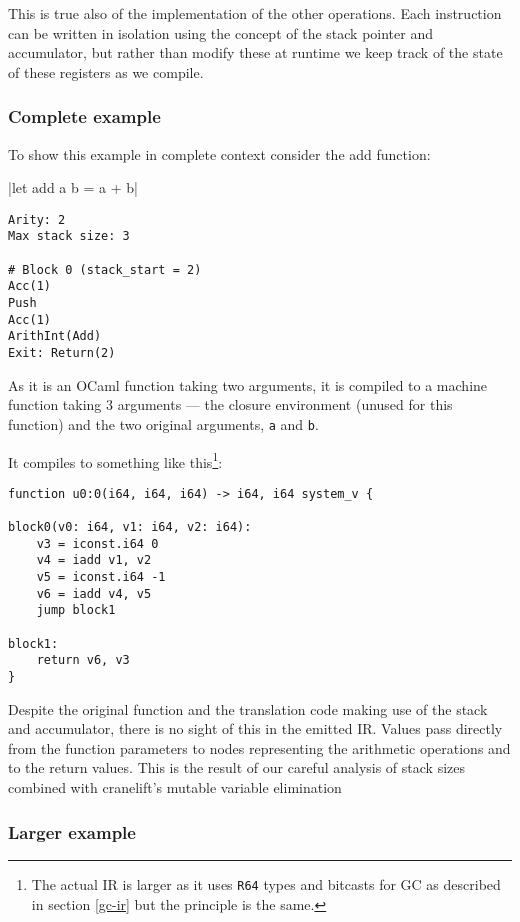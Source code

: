 This is true also of the implementation of the other operations. Each instruction can be written in
isolation using the concept of the stack pointer and accumulator, but rather than modify these at
runtime we keep track of the state of these registers as we compile.

\subsubsection{Complete example}

To show this example in complete context consider the add function:

|let add a b = a + b|

\begin{verbatim}
Arity: 2
Max stack size: 3

# Block 0 (stack_start = 2)
Acc(1)
Push
Acc(1)
ArithInt(Add)
Exit: Return(2)
\end{verbatim}

As it is an OCaml function taking two arguments, it is compiled to a machine function taking 3
arguments --- the closure environment (unused for this function) and the two original arguments,
\texttt{a} and \texttt{b}.

It compiles to something like this\footnote{The actual IR is larger as it uses \texttt{R64} types
      and bitcasts for GC as
      described in section \ref{gc-ir} but the principle is the same.}:

\begin{verbatim}
function u0:0(i64, i64, i64) -> i64, i64 system_v {

block0(v0: i64, v1: i64, v2: i64):
    v3 = iconst.i64 0
    v4 = iadd v1, v2
    v5 = iconst.i64 -1
    v6 = iadd v4, v5
    jump block1

block1:
    return v6, v3
}
\end{verbatim}

Despite the original function and the translation code making use of the stack and accumulator,
there is no sight of this in the emitted IR. Values pass directly from the function parameters to
nodes representing the arithmetic operations and to the return values. This is the result of our
careful analysis of stack sizes combined with cranelift's mutable variable elimination

\subsubsection{Larger example}

